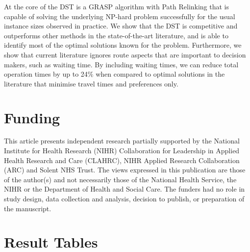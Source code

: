 \documentclass[a4paper,11pt,authoryear]{elsarticle}
\begin{document}
At the core of the DST is a GRASP algorithm with Path Relinking that is capable of solving the underlying NP-hard problem successfully for the usual instance sizes observed in practice. We show that the DST is competitive and outperforms other methods in the state-of-the-art literature, and is able to identify most of the optimal solutions known for the problem. Furthermore, we show that current literature ignores route aspects that are important to decision makers, such as waiting time. By including waiting times, we can reduce total operation times by up to 24\% when compared to optimal solutions in the literature that minimise travel times and preferences only.

\section{Funding}
\label{sec:funding}
\noindent This article presents independent research partially supported by the National Institute for Health Research (NIHR) Collaboration for Leadership in Applied Health Research and Care (CLAHRC), NIHR Applied Research Collaboration (ARC) and Solent NHS Trust. The views expressed in this publication are those of the author(s) and not necessarily those of the National Health Service, the NIHR or the Department of Health and Social Care. The funders had no role in study design, data collection and analysis, decision to publish, or preparation of the manuscript.

% 
% 

% 




%


\newpage



\appendix




\section{Result Tables}
\label{appendix:resulttables}
\end{document}
